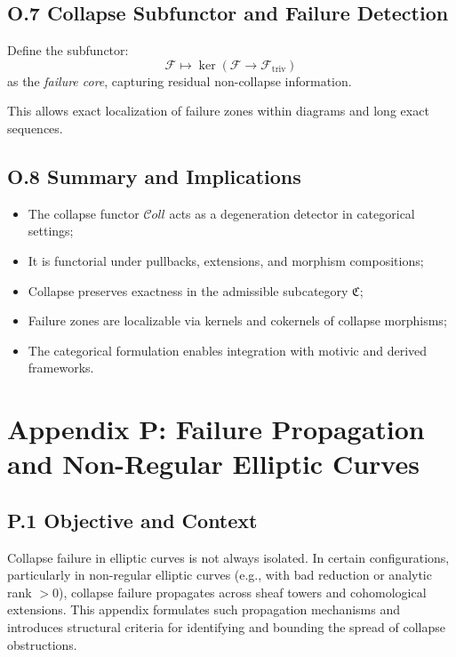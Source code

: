 \documentclass[11pt]{article}
\newcommand{\Coll}{\mathcal{C}oll}
\begin{document}
\subsection*{O.7 Collapse Subfunctor and Failure Detection}

Define the subfunctor:
\[
\mathcal{F} \mapsto \ker(\mathcal{F} \to \mathcal{F}_{\mathrm{triv}})
\]
as the \emph{failure core}, capturing residual non-collapse information.

This allows exact localization of failure zones within diagrams and long exact sequences.

\subsection*{O.8 Summary and Implications}

\begin{itemize}
  \item The collapse functor \( \Coll \) acts as a degeneration detector in categorical settings;
  \item It is functorial under pullbacks, extensions, and morphism compositions;
  \item Collapse preserves exactness in the admissible subcategory \( \mathfrak{C} \);
  \item Failure zones are localizable via kernels and cokernels of collapse morphisms;
  \item The categorical formulation enables integration with motivic and derived frameworks.
\end{itemize}



\appendix
\section*{Appendix P: Failure Propagation and Non-Regular Elliptic Curves}

\subsection*{P.1 Objective and Context}

Collapse failure in elliptic curves is not always isolated. In certain configurations, particularly in non-regular elliptic curves (e.g., with bad reduction or analytic rank \( > 0 \)), collapse failure propagates across sheaf towers and cohomological extensions. This appendix formulates such propagation mechanisms and introduces structural criteria for identifying and bounding the spread of collapse obstructions.
\end{document}
